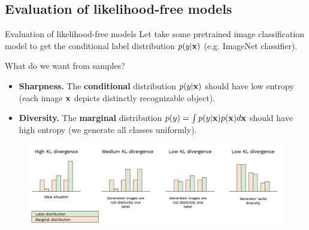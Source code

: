 \documentclass{beamer}
\begin{document}
\subsection{Evaluation of likelihood-free models}
\begin{frame}{Evaluation of likelihood-free models}
	Let take some pretrained image classification model to get the conditional label distribution $p(y | \mathbf{x})$ (e.g. ImageNet classifier).
	\begin{block}{What do we want from samples?}
		\begin{itemize}
			\item \textbf{Sharpness.}
			The \textbf{conditional} distribution $p(y | \mathbf{x})$ should have low entropy (each image $\mathbf{x}$ depicts distinctly recognizable object).
			\item \textbf{Diversity.}
			The \textbf{marginal} distribution $p(y) = \int p(y | \mathbf{x}) p(\mathbf{x}) d \mathbf{x}$ should have high entropy (we generate all classes uniformly).
		\end{itemize}
	\end{block}
	\vspace{-0.3cm}
	\begin{figure}
		\centering
		\includegraphics[width=1.0\linewidth]{figs/is_toy}
	\end{figure}
\end{frame}
\end{document}

